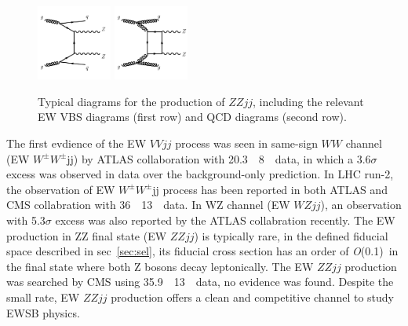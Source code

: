 \begin{figure}[!htbp]
\begin{center}
\includegraphics[width=0.22\textwidth]{figures/diagram/diagram-QCDZZjj-gg.pdf}
\includegraphics[width=0.22\textwidth]{figures/diagram/diagram-QCDZZjj-box.pdf}\\
\end{center}
\caption{Typical diagrams for the production of $ZZjj$, including the relevant EW VBS diagrams (first row) and QCD diagrams (second row).}
\label{fig:diagram}
\end{figure}

The first evdience of the EW $VVjj$ process was seen in same-sign $WW$ channel (EW $W^{\pm}W^{\pm}$jj) by ATLAS collaboration with 20.3~\ifb~8~\tev~data\cite{PhysRevLett.113.141803},
in which a 3.6$\sigma$ excess was observed in data over the background-only prediction.
In LHC run-2, the observation of EW $W^{\pm}W^{\pm}$jj process has been reported in both ATLAS and CMS collabration with 36~\ifb~13~\tev~data\cite{Aaboud:2019nmv, Sirunyan:2017ret}.
In WZ channel (EW $WZjj$), an observation with 5.3$\sigma$ excess was also reported by the ATLAS collabration recently\cite{Aaboud:2018ddq}.
The EW production in ZZ final state (EW $ZZjj$) is typically rare, in the defined fiducial space described in sec~\ref{sec:sel}, its fiducial cross section has an order of \textit{O}(0.1)~\ifb in the final state where both Z bosons decay leptonically.
The EW $ZZjj$ production was searched by CMS using 35.9~\ifb~13~\tev~data, no evidence was found\cite{Sirunyan:2017fvv}.
Despite the small rate, EW $ZZjj$ production offers a clean and competitive channel to study EWSB physics.

